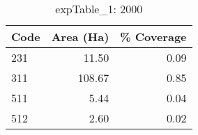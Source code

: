 \begin{table}[ht]
\centering
\begin{tabular}{lrr}
  \hline
Code & Area (Ha) & \% Coverage \\ 
  \hline
231 & 11.50 & 0.09 \\ 
  311 & 108.67 & 0.85 \\ 
  511 & 5.44 & 0.04 \\ 
  512 & 2.60 & 0.02 \\ 
   \hline
\end{tabular}
\caption{expTable\_1: 2000} 
\end{table}
